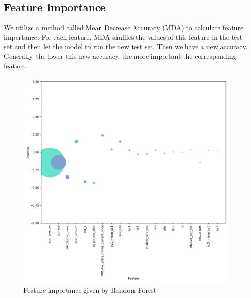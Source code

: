 \documentclass[10pt, conference, compsocconf]{IEEEtran}
\begin{document}
\subsection{Feature Importance}
We utilize a method called Mean Decrease Accuracy (MDA) to calculate feature importance. For each feature, MDA shuffles the values of this 
feature in the test set and then let the model to run the new test set. Then we have a new accuracy. Generally, the lower this new accuracy, 
the more important the corresponding feature.

\begin{figure}[ht]
	\centering
	\includegraphics[scale=0.07]{fi_rf_npd.png}
	\caption{Feature importance given by Random Forest} \label{fig 10}
\end{figure}
\end{document}
